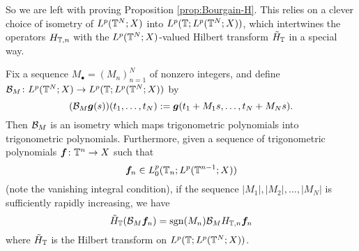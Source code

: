 So we are left with proving Proposition \ref{prop:Bourgain-H}.
This relies on a clever choice of isometry of $L^p(\mathbb{T}^{N};X)$ into $L^p(\mathbb{T}; L^p(\mathbb{T}^{N};X))$, which intertwines the operators $H_{\mathbb{T},n}$ with the $L^p(\mathbb{T}^{N};X)$-valued Hilbert transform $\tilde{H}_{\mathbb{T}}$ in a special way.

\begin{lem}\label{lem:Bourgain}
  Fix a sequence $M_{\bullet} = (M_{n})_{n=1}^{N}$ of nonzero integers, and define $\mathcal{B}_{M} \colon L^p(\mathbb{T}^{N};X) \to L^{p}(\mathbb{T}; L^p(\mathbb{T}^{N};X))$ by
  \begin{equation*}
    (\mathcal{B}_{M} \bm{g}(s))(t_{1}, \ldots, t_{N}) := \bm{g}(t_{1} + M_{1} s, \ldots, t_{N} + M_{N} s).
  \end{equation*}
  Then $\mathcal{B}_{M}$ is an isometry which maps trigonometric polynomials into trigonometric polynomials.
  Furthermore, given a sequence of trigonometric polynomials $\bm{f} \colon \mathbb{T}^{n} \to X$ such that
  \begin{equation*}
    \bm{f}_{n} \in L^p_{0}(\mathbb{T}_{n}; L^p(\mathbb{T}^{n-1};X))
  \end{equation*}
  (note the vanishing integral condition), if the sequence $|M_{1}|, |M_{2}|, \ldots, |M_{N}|$ is sufficiently rapidly increasing, we have
  \begin{equation}\label{eq:B-ident}
    \tilde{H}_{\mathbb{T}} (\mathcal{B}_{M} \bm{f}_{n}) = \operatorname{sgn}(M_{n}) \mathcal{B}_{M} H_{\mathbb{T},n} \bm{f}_{n}
  \end{equation}
  where $\tilde{H}_{\mathbb{T}}$ is the Hilbert transform on $L^p(\mathbb{T}; L^p(\mathbb{T}^{N};X))$.
\end{lem}

